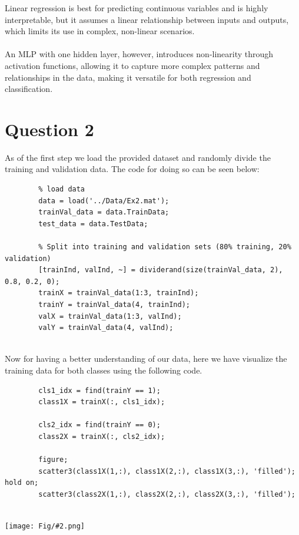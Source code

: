 \documentclass[]{article}
\newcommand{\pict}[2]{\begin{center}
		\texttt{[image: Fig/\#2.png]}
\end{center}}
\begin{document}
	Linear regression is best for predicting continuous variables and is highly interpretable, but it assumes a linear relationship between inputs and outputs, which limits its use in complex, non-linear scenarios.\\\\
	An MLP with one hidden layer, however, introduces non-linearity through activation functions, allowing it to capture more complex patterns and relationships in the data, making it versatile for both regression and classification.
	
\newpage
	\section{Question 2}
	As of the first step we load the provided dataset and randomly divide the training and validation data. The code for doing so can be seen below:
	\begin{lstlisting}
		% load data
		data = load('../Data/Ex2.mat');
		trainVal_data = data.TrainData;
		test_data = data.TestData;
		
		% Split into training and validation sets (80% training, 20% validation)
		[trainInd, valInd, ~] = dividerand(size(trainVal_data, 2), 0.8, 0.2, 0);
		trainX = trainVal_data(1:3, trainInd);
		trainY = trainVal_data(4, trainInd);
		valX = trainVal_data(1:3, valInd);
		valY = trainVal_data(4, valInd);
		
	\end{lstlisting}
	Now for having a better understanding of our data, here we have visualize the training data for both classes using the following code.
	\begin{lstlisting}
		cls1_idx = find(trainY == 1);
		class1X = trainX(:, cls1_idx);
		
		cls2_idx = find(trainY == 0);
		class2X = trainX(:, cls2_idx);
		
		figure;
		scatter3(class1X(1,:), class1X(2,:), class1X(3,:), 'filled'); hold on;
		scatter3(class2X(1,:), class2X(2,:), class2X(3,:), 'filled');
		
	\end{lstlisting}
	\pict{1}{F14}
	
\end{document}
